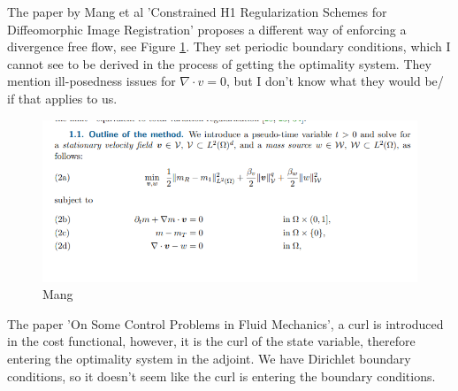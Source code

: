 \documentclass[11pt, a4paper]{article}
\theoremstyle{definition}
\begin{document}
The paper by Mang et al 'Constrained H1 Regularization Schemes for Diffeomorphic Image Registration' proposes a different way of enforcing a divergence free flow, see Figure \ref{F2}. They set periodic boundary conditions, which I cannot see to be derived in the process of getting the optimality system. They mention ill-posedness issues for $\nabla \cdot v = 0$, but I don't know what they would be/ if that applies to us.
	\begin{figure}[h]
	\centering
	\includegraphics[scale=0.7]{Mang.png}
	\caption{Mang} 
	\label{F2}
\end{figure}
The paper 'On Some Control Problems in Fluid Mechanics', a curl is introduced in the cost functional, however, it is the curl of the state variable, therefore entering the optimality system in the adjoint. We have Dirichlet boundary conditions, so it doesn't seem like the curl is entering the boundary conditions.
\end{document}
